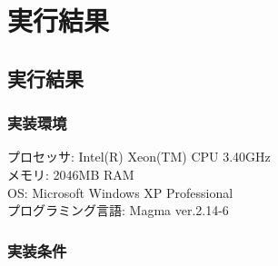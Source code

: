 \chapter{実行結果}
\section{実行結果}
\subsection{実装環境}
\noindent プロセッサ: Intel(R) Xeon(TM) CPU 3.40GHz\\
メモリ: 2046MB RAM\\
OS: Microsoft Windows XP Professional\\
プログラミング言語: Magma ver.2.14-6

\subsection{実装条件}
\noindent

